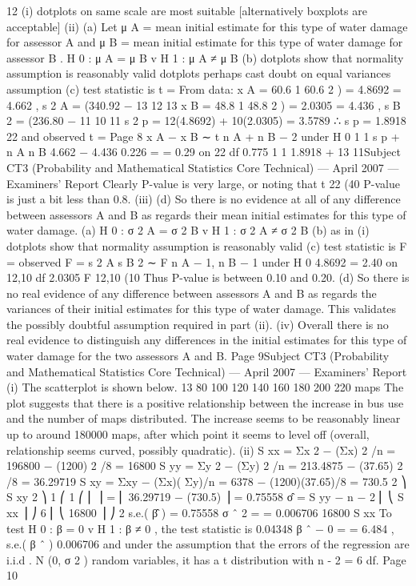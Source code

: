 \documentclass[a4paper,12pt]{article}
\begin{document}
\begin{enumerate}
12
(i)
dotplots on same scale are most suitable
[alternatively boxplots are acceptable]
(ii)
(a)
Let μ A = mean initial estimate for this type of water damage for assessor A and μ B = mean initial estimate for this type of water damage
for assessor B .
H 0 : μ A = μ B v H 1 : μ A ≠ μ B
(b) dotplots show that normality assumption is reasonably valid
dotplots perhaps cast doubt on equal variances assumption
(c) test statistic is t =
From data: x A = 60.6
1
60.6 2
) = 4.8692
= 4.662 , s 2 A = (340.92 −
13
12
13
x B = 48.8
1
48.8 2
) = 2.0305
= 4.436 , s B 2 = (236.80 −
11
10
11
s 2 p = 12(4.8692) + 10(2.0305)
= 3.5789 ∴ s p = 1.8918
22
and
observed t =
Page 8
x A − x B
∼ t n A + n B − 2 under H 0
1
1
s p
+
n A n B
4.662 − 4.436
0.226
=
= 0.29 on 22 df
0.775
1 1
1.8918
+
13 11Subject CT3 (Probability and Mathematical Statistics Core Technical) — April 2007 — Examiners’ Report
Clearly P-value is very large, or noting that t 22 (40%
P-value is just a bit less than 0.8.
(iii)
(d) So there is no evidence at all of any difference between assessors A
and B as regards their mean initial estimates for this type of water
damage.
(a) H 0 : σ 2 A = σ 2 B v H 1 : σ 2 A ≠ σ 2 B
(b) as in (i) dotplots show that normality assumption is reasonably valid
(c) test statistic is F =
observed F =
s 2 A
s B 2
∼ F n A − 1, n B − 1 under H 0
4.8692
= 2.40 on 12,10 df
2.0305
F 12,10 (10%
Thus P-value is between 0.10 and 0.20.
(d)
So there is no real evidence of any difference between assessors A and B as regards the variances of their initial estimates for this type of water damage.
This validates the possibly doubtful assumption required in part (ii).
(iv)
Overall there is no real evidence to distinguish any differences in the initial
estimates for this type of water damage for the two assessors A and B.
Page 9Subject CT3 (Probability and Mathematical Statistics Core Technical) — April 2007 — Examiners’ Report
(i)
The scatterplot is shown below.
13
80
100
120
140
160
180
200
220
maps
The plot suggests that there is a positive relationship between the increase in
bus use and the number of maps distributed. The increase seems to be
reasonably linear up to around 180000 maps, after which point it seems to
level off (overall, relationship seems curved, possibly quadratic).
(ii)
S xx = Σx 2 − (Σx) 2 /n = 196800 − (1200) 2 /8 = 16800
S yy = Σy 2 − (Σy) 2 /n = 213.4875 − (37.65) 2 /8 = 36.29719
S xy = Σxy − (Σx)( Σy)/n = 6378 − (1200)(37.65)/8 = 730.5
2 ⎞
S xy 2 ⎞ 1 ⎛
1 ⎛ ⎜
⎟ = ⎜ 36.29719 − (730.5) ⎟ = 0.75558
σ̂ =
S yy −
n − 2 ⎜ ⎝
S xx ⎟ ⎠ 6 ⎜ ⎝
16800 ⎟ ⎠
2
s.e.( β̂ ) =
0.75558
σ ˆ 2
=
= 0.006706
16800
S xx
To test H 0 : β = 0 v H 1 : β ≠ 0 , the test statistic is
0.04348
β ˆ − 0
=
= 6.484 ,
s.e.( β ˆ ) 0.006706
and under the assumption that the errors of the regression are i.i.d . N (0, σ 2 )
random variables, it has a t distribution with n - 2 = 6 df.
Page 10


\end{enumerate}
\end{document}
